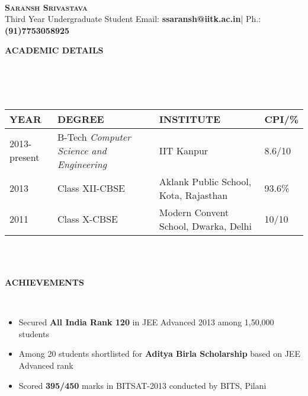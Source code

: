 \documentclass[a4paper,10pt]{article}
\newcommand{\isep}{-2 pt}
\newcommand{\lsep}{-0.5cm}
\newcommand{\resheading}[1]{{\small \colorbox{mygrey}{\begin{minipage}{0.975\textwidth}{\textbf{#1 \vphantom{p\^{E}}}}\end{minipage}}}}
\begin{document}
\hspace{0.5cm}\\[-0.2cm]

\textbf{\LARGE \textsc{Saransh Srivastava}}\\
\indent Third Year Undergraduate Student\hfill
Email: \textbf{ssaransh@iitk.ac.in}|
Ph.: \textbf{(91)7753058925} \\

\resheading{\textbf{ACADEMIC DETAILS} }\\[\lsep]
\\ \\
\indent \begin{tabular}{ L{3cm} L{6cm} L{8cm} L{2cm} }
\hline
\textbf{YEAR} & \textbf{DEGREE} & \textbf{INSTITUTE}  & \textbf{CPI/\%} \\
\hline

2013-present & B-Tech \emph{Computer Science and Engineering} & IIT Kanpur & 8.6/10 \\
2013 & Class XII-CBSE & Aklank Public School, Kota, Rajasthan  & 93.6\% \\
2011 & Class X-CBSE & Modern Convent School, Dwarka, Delhi & 10/10 \\
\hline
\end{tabular}
\\ \\


\resheading{\textbf{ACHIEVEMENTS} }\\[\lsep]
\begin{itemize}\itemsep \isep
\item \noindent Secured \textbf{All India Rank 120} in JEE Advanced 2013 among 1,50,000 students\\
\item \noindent Among 20 students shortlisted for \textbf{Aditya Birla Scholarship} based on JEE Advanced rank\\
\item \noindent Scored \textbf{395/450} marks in BITSAT-2013 conducted by BITS, Pilani
\end{itemize}
\end{document}
